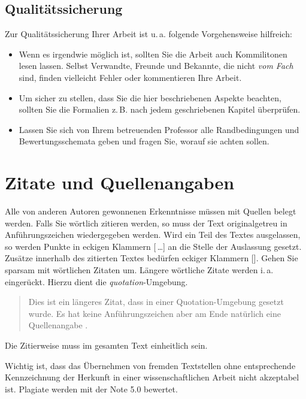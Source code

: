 \documentclass[conference,compsoc,final,a4paper]{IEEEtran}
\begin{document}
\subsection{Qualitätssicherung}
Zur Qualitätssicherung Ihrer Arbeit ist u.\,a. folgende Vorgehensweise hilfreich:
\begin{itemize}
\item Wenn es irgendwie möglich ist, sollten Sie die Arbeit auch Kommilitonen lesen lassen. Selbst Verwandte, Freunde und Bekannte, die nicht \emph{vom Fach} sind, finden vielleicht Fehler oder kommentieren Ihre Arbeit.
\item Um sicher zu stellen, dass Sie die hier beschriebenen Aspekte beachten, sollten Sie die Formalien z.\,B. nach jedem geschriebenen Kapitel überprüfen.
\item Lassen Sie sich von Ihrem betreuenden Professor alle Randbedingungen und Bewertungsschemata geben und fragen Sie, worauf sie achten sollen.
\end{itemize}



\section{Zitate und Quellenangaben}\label{quellen}
Alle von anderen Autoren gewonnenen Erkenntnisse müssen mit Quellen belegt werden. Falls Sie wörtlich zitieren werden, so muss der Text originalgetreu in Anführungszeichen wiedergegeben werden. Wird ein Teil des Textes ausgelassen, so werden Punkte in eckigen Klammern [\,\dots] an die Stelle der Auslassung gesetzt. Zusätze innerhalb des zitierten Textes bedürfen eckiger Klammern []. Gehen Sie sparsam mit wörtlichen Zitaten um. Längere wörtliche Zitate werden i.\,a. eingerückt. Hierzu dient die \textit{quotation}-Umgebung.

\begin{quotation}
Dies ist ein längeres Zitat, dass in einer Quotation-Umgebung gesetzt wurde. Es hat keine Anführungszeichen aber am Ende natürlich eine Quellenangabe \cite{Kornmeier2011}.
\end{quotation}

Die Zitierweise muss im gesamten Text einheitlich sein.

Wichtig ist, dass das Übernehmen von fremden Textstellen ohne entsprechende Kennzeichnung der Herkunft in einer wissenschaftlichen Arbeit nicht akzeptabel ist. Plagiate werden mit der Note 5.0 bewertet.
\end{document}
